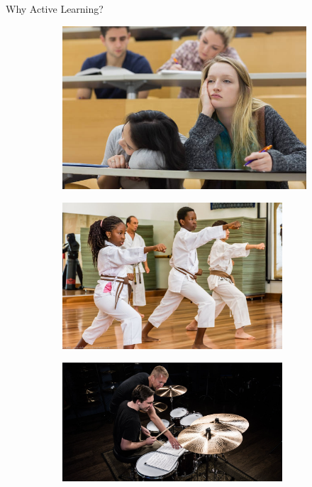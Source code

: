 \documentclass[10pt]{beamer}
\begin{document}
 
\begin{frame}{Why Active Learning?}


\begin{figure}[h!]
    \centering

    \begin{subfigure}{0.5\textwidth}
        \centering
        \includegraphics[width=.9\textwidth]{images/bored_student} 
    \end{subfigure}

    \vspace{1cm}
    
    \begin{subfigure}{0.45\textwidth}
        \includegraphics[width=0.9\textwidth]{images/karate} 
 
    \end{subfigure}
    \hfill
    \begin{subfigure}{0.45\textwidth}
        \includegraphics[width=0.9\textwidth]{images/drums} 


\end{subfigure}
\end{figure}
\end{frame}
\end{document}
